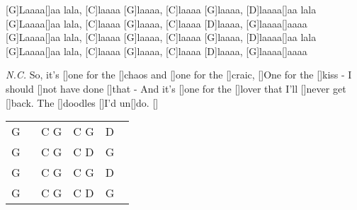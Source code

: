 \begin{guitar}
	[G]Laaaa[]aa lala, [C]laaaa [G]laaaa, [C]laaaa [G]laaaa, [D]laaaa[]aa lala
	[G]Laaaa[]aa lala, [C]laaaa [G]laaaa, [C]laaaa [D]laaaa, [G]laaaa[]aaaa
	[G]Laaaa[]aa lala, [C]laaaa [G]laaaa, [C]laaaa [G]laaaa, [D]laaaa[]aa lala
	[G]Laaaa[]aa lala, [C]laaaa [G]laaaa, [C]laaaa [D]laaaa, [G]laaaa[]aaaa
	
	 {\footnotesize\textit{N.C.}}
	So, it's []one for the []chaos and []one for the []craic,
	[]One for the []kiss - I should []not have done []that -
	And it's []one for the []lover that I'll []never get []back. 
	The []doodles []I'd un[]do. []{}
	
	{\footnotesize\begin{tabular}{|l|l|l|l|}
			G ~ & C G & C G & D ~ \\
			G & C G & C D & G \\
			G & C G & C G & D \\
			G & C G & C D & G 
	\end{tabular}}
	
	\begin{highlightbar}
		 
	\end{highlightbar}
\end{guitar}